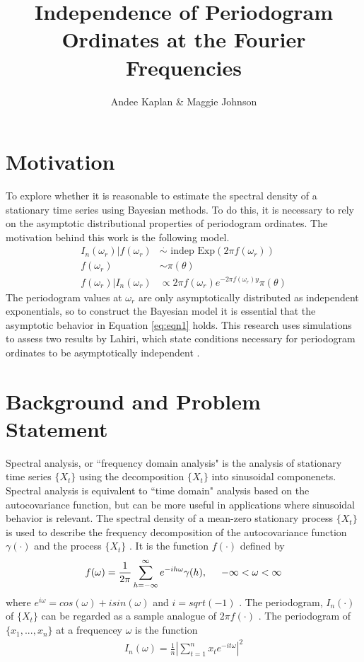 \documentclass{article}\usepackage{graphicx, color}
\title{Independence of Periodogram Ordinates at the Fourier Frequencies}
\author{Andee Kaplan \& Maggie Johnson}
\newcommand{\mj}[1]{{\color{blue} #1}}
\theoremstyle{plain}
\begin{document}
\maketitle



\section{Motivation}

To explore whether it is reasonable to estimate the spectral density of a stationary time series using Bayesian methods. To do this, it is necessary to rely on the asymptotic distributional properties of periodogram ordinates. The motivation behind this work is the following model.
\begin{align}
\label{eq:eqn1}
I_n(\omega_r) |f(\omega_r) &\stackrel{\cdot}{\sim}\text{ indep } \text{Exp}(2\pi f(\omega_r)) \\
\label{eq:eqn2}
f(\omega_r) & \sim \pi(\theta)\\
\label{eq:eqn3}
f(\omega_r) | I_n(\omega_r) &\propto 2\pi f(\omega_r) e^{-2\pi f(\omega_r) y} \pi(\theta)
\end{align}
The periodogram values at $\omega_r$ are only asymptotically distributed as independent exponentials, so to construct the Bayesian model it is essential that the asymptotic behavior in Equation \ref{eq:eqn1} holds. This research uses simulations to assess two results by Lahiri, which state conditions necessary for periodogram ordinates to be asymptotically independent \cite{lahiri2003necessary}.


\section{Background and Problem Statement}

Spectral analysis, or ``frequency domain analysis" is the analysis of stationary time series $\{X_t\}$ using the decomposition $\{X_t\}$ into sinusoidal componenets. Spectral analysis is equivalent to ``time domain" analysis based on the autocovariance function, but can be more useful in applications where sinusoidal behavior is relevant. The spectral density of a mean-zero stationary process $\{X_t\}$ is used to describe the frequency decomposition of the autocovariance function $\gamma(\cdot)$ and the process $\{X_t\}$ \cite{brockwell2002introduction}. It is the function $f(\cdot)$ defined by 
\begin{align}
f(\omega) = \frac{1}{2\pi} \sum_{h=-\infty}^{\infty} e^{-ih\omega} \gamma(h), \hspace{.5cm} -\infty < \omega < \infty
\end{align}
where $e^{i\omega}=cos(\omega)+isin(\omega)$ and $i=sqrt(-1)$ \cite{brockwell2002introduction}. The periodogram, $I_n(\cdot)$ of $\{X_t\}$ can be regarded as a \mj{sample analogue} of $2\pi f(\cdot)$ \cite{brockwell2002introduction}. The periodogram of $\{x_1,...,x_n\}$ at a frequencey $\omega$ is the function
\begin{align}
I_n(\omega) = \frac{1}{n} \left\lvert \sum_{t=1}^n x_t e^{-it\omega} \right\rvert^2
\end{align}
\end{document}

